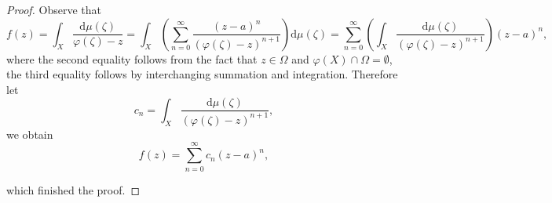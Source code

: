 \begin{proof}
Observe that 
$$
f\left( z \right) =\int_X{\frac{\mathrm{d}\mu \left( \zeta \right)}{\varphi \left( \zeta \right) -z}}=\int_X{\left( \sum_{n=0}^{\infty}{\frac{\left( z-a \right) ^n}{\left( \varphi \left( \zeta \right) -z \right) ^{n+1}}} \right) \mathrm{d}\mu \left( \zeta \right)}=\sum_{n=0}^{\infty}{\left( \int_X{\frac{\mathrm{d}\mu \left( \zeta \right)}{\left( \varphi \left( \zeta \right) -z \right) ^{n+1}}} \right) \left( z-a \right) ^n},
$$
where the second equality follows from the fact that $z\in\Omega$ and $\varphi(X)\cap\Omega=\emptyset$, the third equality follows by interchanging summation and integration. Therefore let 
$$
c_n=\int_X{\frac{\mathrm{d}\mu \left( \zeta \right)}{\left( \varphi \left( \zeta \right) -z \right) ^{n+1}}},
$$
we obtain 
$$f(z)=\sum_{n=0}^\infty c_n(z-a)^n,$$\par
which finished the proof.
\end{proof}
